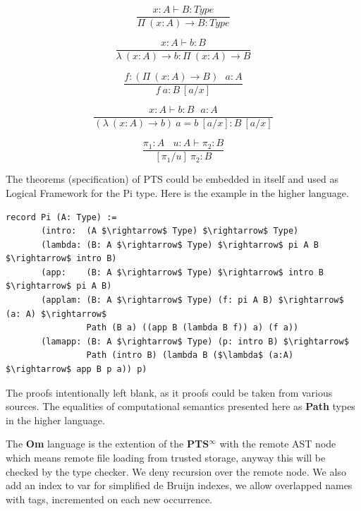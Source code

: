 \documentclass{aip-cp}
\begin{document}
\begin{equation}
\tag{$\Pi$-formation}
\dfrac
{x:A \vdash B : Type}
{\Pi\ (x:A) \rightarrow B : Type}
\end{equation}

\begin{equation}
\tag{$\lambda$-intro}
\dfrac
{x:A \vdash b : B}
{\lambda\ (x:A) \rightarrow b : \Pi\ (x: A) \rightarrow B }
\end{equation}

\begin{equation}
\tag{$App$-elimination}
\dfrac
{f: (\Pi\ (x:A) \rightarrow B)\ \ \ a: A}
{f\ a : B\ [a/x]}
\end{equation}

\begin{equation}
\tag{$\beta$-computation}
\dfrac
{x:A \vdash b: B\ \ \ a:A}
{(\lambda\ (x:A) \rightarrow b)\ a = b\ [a/x] : B\ [a/x]}
\end{equation}

\begin{equation}
\tag{subst}
\dfrac
{\pi_1 : A\ \ \ \ u:A \vdash \pi_2 : B}
{[\pi_1/u]\ \pi_2 : B}
\end{equation}

The theorems (specification) of PTS could be embedded in itself and used as
Logical Framework for the Pi type. Here is the example in the higher language.

\begin{lstlisting}[mathescape=true]
record Pi (A: Type) :=
       (intro:  (A $\rightarrow$ Type) $\rightarrow$ Type)
       (lambda: (B: A $\rightarrow$ Type) $\rightarrow$ pi A B $\rightarrow$ intro B)
       (app:    (B: A $\rightarrow$ Type) $\rightarrow$ intro B $\rightarrow$ pi A B)
       (applam: (B: A $\rightarrow$ Type) (f: pi A B) $\rightarrow$ (a: A) $\rightarrow$
                Path (B a) ((app B (lambda B f)) a) (f a))
       (lamapp: (B: A $\rightarrow$ Type) (p: intro B) $\rightarrow$
                Path (intro B) (lambda B ($\lambda$ (a:A) $\rightarrow$ app B p a)) p)
\end{lstlisting}

The proofs intentionally left blank, as it proofs could be taken from various sources\cite{Henk93}.
The equalities of computational semantics presented here as {\bf Path} types in the higher language.

The {\bf Om} language is the extention of the {\bf PTS$^\infty$} with the
remote AST node which means remote file loading
from trusted storage, anyway this will be checked by the type checker. We deny recursion
over the remote node. We also add an index to var for simplified de Bruijn indexes,
we allow overlapped names with tags, incremented on each new occurrence.
\end{document}
